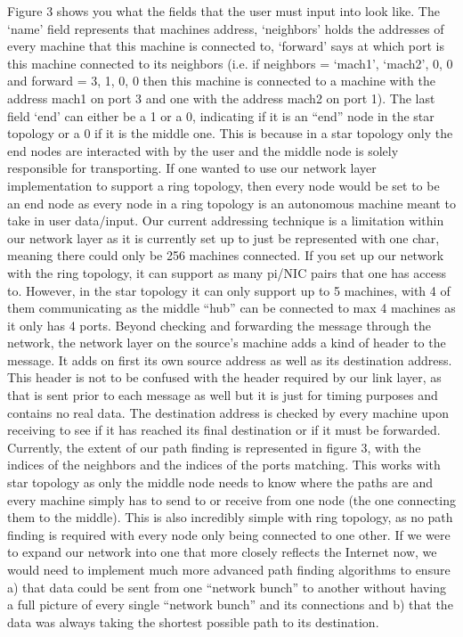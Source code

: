 \documentclass[10pt, letterpaper, twocolumn]{article}
\begin{document}
Figure 3 shows you what the fields that the user must input into look like. The ‘name’ field represents that machines address, ‘neighbors’ holds the addresses of every machine that this machine is connected to, ‘forward’ says at which port is this machine connected to its neighbors (i.e. if neighbors = {‘mach1’, ‘mach2’, 0, 0} and forward = {3, 1, 0, 0} then this machine is connected to a machine with the address mach1 on port 3 and one with the address mach2 on port 1). The last field ‘end’ can either be a 1 or a 0, indicating if it is an “end” node in the star topology or a 0 if it is the middle one. This is because in a star topology only the end nodes are interacted with by the user and the middle node is solely responsible for transporting. If one wanted to use our network layer implementation to support a ring topology, then every node would be set to be an end node as every node in a ring topology is an autonomous machine meant to take in user data/input. 
Our current addressing technique is a limitation within our network layer as it is currently set up to just be represented with one char, meaning there could only be 256 machines connected. If you set up our network with the ring topology, it can support as many pi/NIC pairs that one has access to. However, in the star topology it can only support up to 5 machines, with 4 of them communicating as the middle “hub” can be connected to max 4 machines as it only has 4 ports. 
Beyond checking and forwarding the message through the network, the network layer on the source’s machine adds a kind of header to the message. It adds on first its own source address as well as its destination address. This header is not to be confused with the header required by our link layer, as that is sent prior to each message as well but it is just for timing purposes and contains no real data. The destination address is checked by every machine upon receiving to see if it has reached its final destination or if it must be forwarded. Currently, the extent of our path finding is represented in figure 3, with the indices of the neighbors and the indices of the ports matching. This works with star topology as only the middle node needs to know where the paths are and every machine simply has to send to or receive from one node (the one connecting them to the middle). This is also incredibly simple with ring topology, as no path finding is required with every node only being connected to one other. If we were to expand our network into one that more closely reflects the Internet now, we would need to implement much more advanced path finding algorithms to ensure a) that data could be sent from one “network bunch” to another without having a full picture of every single “network bunch” and its connections and b) that the data was always taking the shortest possible path to its destination. 
\end{document}
